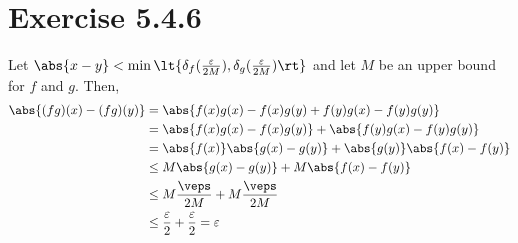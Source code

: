 \documentclass[11pt]{article}
\begin{document}
\section*{Exercise 5.4.6}\vspace{-1em}
    Let $\abs{x-y}<\min\lt\{\delta_f(\frac{\varepsilon}{2M}),\delta_g(\frac{\varepsilon}{2M})\rt\}$ and let $M$ be an upper bound for $f$ and $g$. Then,
    \begin{align}
        \abs{(fg)(x)-(fg)(y)} &= \abs{f(x)g(x)-f(x)g(y)+f(y)g(x)-f(y)g(y)} \\
            &= \abs{f(x)g(x)-f(x)g(y)}+\abs{f(y)g(x)-f(y)g(y)} \\
            &= \abs{f(x)}\abs{g(x)-g(y)}+\abs{g(y)}\abs{f(x)-f(y)} \\
            &\leq M\abs{g(x)-g(y)}+M\abs{f(x)-f(y)} \\
            &\leq M\frac{\veps}{2M}+M\frac{\veps}{2M} \\
            &\leq \frac{\varepsilon}{2}+\frac{\varepsilon}{2} = \varepsilon
    \end{align}
\end{document}
